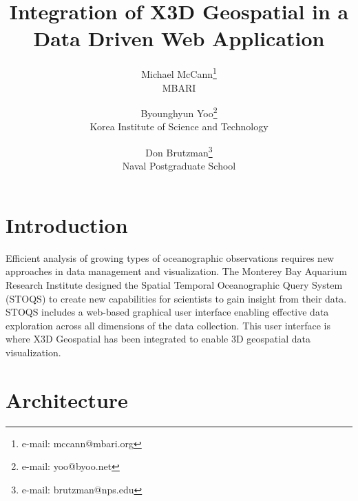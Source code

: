 \documentclass[annualconference]{acmsiggraph}  %
\title{Integration of X3D Geospatial in a Data Driven Web Application}
\author{Michael McCann\thanks{e-mail: mccann@mbari.org}\\MBARI
\and Byounghyun Yoo\thanks{e-mail: yoo@byoo.net}\\Korea Institute of Science and Technology
\and Don Brutzman\thanks{e-mail: brutzman@nps.edu}\\Naval Postgraduate School}
\begin{document}

\maketitle








\section{Introduction}

Efficient analysis of growing types of oceanographic observations requires new approaches in data management and visualization. The Monterey Bay Aquarium Research Institute designed the Spatial Temporal Oceanographic Query System (STOQS) \cite{STOQS} to create new capabilities for scientists to gain insight from their data. STOQS includes a web-based graphical user interface enabling effective data exploration across all dimensions of the data collection. This user interface is where X3D Geospatial has been integrated to enable 3D geospatial data visualization. 

\section{Architecture}
\end{document}
